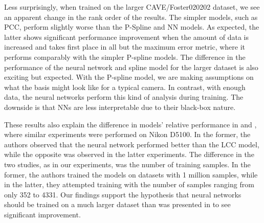 Less surprisingly, when trained on the larger CAVE/Foster020202 dataset, we see an apparent change in the rank order of the results. The simpler models, such as PCC, perform slightly worse than the P-Spline and NN models. As expected, the latter shows significant performance improvement when the amount of data is increased and takes first place in all but the maximum error metric, where it performs comparably with the simpler P-spline models. The difference in the performance of the neural network and spline model for the larger dataset is also exciting but expected. With the P-spline model, we are making assumptions on what the basis might look like for a typical camera. In contrast, with enough data, the neural networks perform this kind of analysis during training. The downside is that NNs are less interpretable due to their black-box nature.

These results also explain the difference in models' relative performance in \cite{macdonald2021camera} and \cite{kucuk2023performance}, where similar experiments were performed on Nikon D5100. In the former, the authors observed that the neural network performed better than the LCC model, while the opposite was observed in the latter experiments. The difference in the two studies, as in our experiments, was the number of training samples. In the former, the authors trained the models on datasets with 1 million samples, while in the latter, they attempted training with the number of samples ranging from only 352 to 4331. Our findings support the hypothesis that neural networks should be trained on a much larger dataset than was presented in \cite{kucuk2023performance} to see significant improvement.


